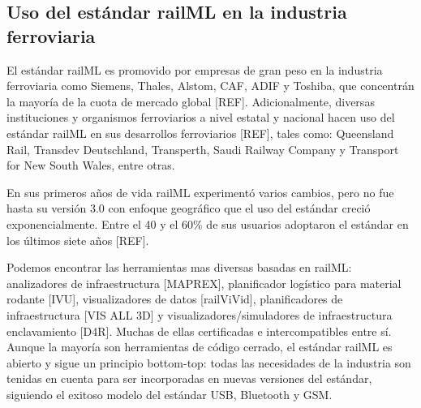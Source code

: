 \subsection{Uso del estándar railML en la industria ferroviaria}

    El estándar railML es promovido por empresas de gran peso en la industria ferroviaria como Siemens, Thales, Alstom, CAF, ADIF y Toshiba, que concentrán la mayoría de la cuota de mercado global [REF]. Adicionalmente, diversas instituciones y organismos ferroviarios a nivel estatal y nacional hacen uso del estándar railML en sus desarrollos ferroviarios [REF], tales como: Queensland Rail, Transdev Deutschland, Transperth, Saudi Railway Company y Transport for New South Wales, entre otras.

    En sus primeros años de vida railML experimentó varios cambios, pero no fue hasta su versión 3.0 con enfoque geográfico que el uso del estándar creció exponencialmente. Entre el 40 y el 60\% de sus usuarios adoptaron el estándar en los últimos siete años [REF].

    Podemos encontrar las herramientas mas diversas basadas en railML: analizadores de infraestructura [MAPREX], planificador logístico para material rodante [IVU], visualizadores de datos [railViVid], planificadores de infraestructura [VIS ALL 3D] y visualizadores/simuladores de infraestructura enclavamiento [D4R]. Muchas de ellas certificadas e intercompatibles entre sí. Aunque la mayoría son herramientas de código cerrado, el estándar railML es abierto y sigue un principio bottom-top: todas las necesidades de la industria son tenidas en cuenta para ser incorporadas en nuevas versiones del estándar, siguiendo el exitoso modelo del estándar USB, Bluetooth y GSM. 